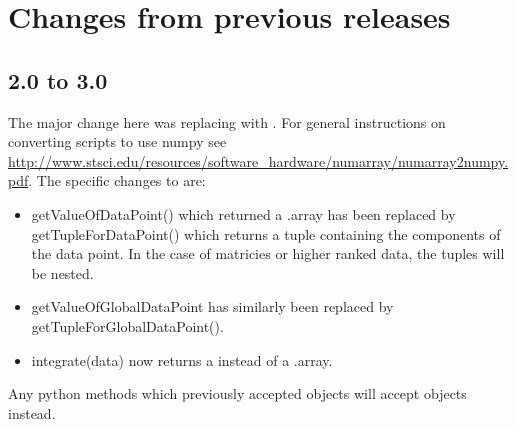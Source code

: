 
%
%
%

\section{Changes from previous releases}
\label{app:changes}

\subsection*{2.0 to 3.0}
The major change here was replacing  with \numpy.
For general instructions on converting scripts to use numpy see \url{http://www.stsci.edu/resources/software_hardware/numarray/numarray2numpy.pdf}.
The specific changes to \escript are:
\begin{itemize}
  \item getValueOfDataPoint() which returned a .array has been replaced by
 getTupleForDataPoint() which returns a \PYTHON tuple containing
the components of the data point. In the case of matricies or higher ranked data, the tuples will be nested.
 \item getValueOfGlobalDataPoint has similarly been replaced by getTupleForGlobalDataPoint().
 \item integrate(data) now returns a \numpyNDA instead of a .array.
\end{itemize}
Any python methods which previously accepted  objects will accept \numpy objects instead.

